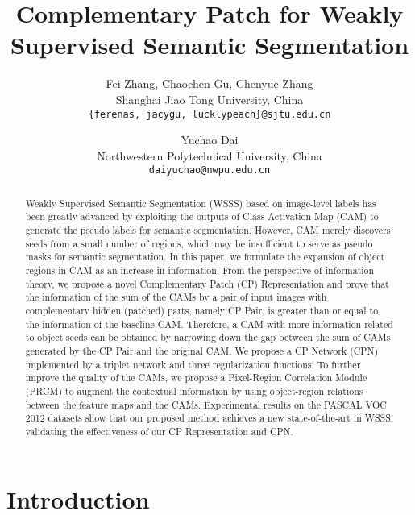 \documentclass[10pt,twocolumn,letterpaper]{article}
\begin{document}
\title{Complementary Patch for Weakly Supervised Semantic Segmentation}

\author{Fei Zhang, Chaochen Gu\footnotemark[1], Chenyue Zhang\\
Shanghai Jiao Tong University, China\\
{\tt\small \{ferenas, jacygu, lucklypeach\}@sjtu.edu.cn}
\and
Yuchao Dai\\
Northwestern Polytechnical University, China\\
{\tt\small daiyuchao@nwpu.edu.cn}
}

\maketitle

\renewcommand{\thefootnote}{\fnsymbol{footnote}}  

\ificcvfinal\thispagestyle{empty}\fi

\begin{abstract}
Weakly Supervised Semantic Segmentation (WSSS) based on image-level labels has been greatly advanced by exploiting the outputs of Class Activation Map (CAM) to generate the pseudo labels for semantic segmentation. However, CAM merely discovers seeds from a small number of regions, which may be insufficient to serve as pseudo masks for semantic segmentation.
In this paper, we formulate the expansion of object regions in CAM as an increase in information. From the perspective of information theory, we propose a novel Complementary Patch (CP) Representation and prove that the information of the sum of the CAMs by a pair of input images with complementary hidden (patched) parts, namely CP Pair, is greater than or equal to the information of the baseline CAM.
Therefore, a CAM with more information related to object seeds can be obtained by narrowing down the gap between the sum of CAMs generated by the CP Pair and the original CAM.
We propose a CP Network (CPN) implemented by a triplet network and three regularization functions.
To further improve the quality of the CAMs, we propose a Pixel-Region Correlation Module (PRCM) to augment the contextual information by using object-region relations between the feature maps and the CAMs.
Experimental results on the PASCAL VOC 2012 datasets show that our proposed method achieves a new state-of-the-art in WSSS, validating the effectiveness of our CP Representation and CPN.
\end{abstract}
\section{Introduction}
\end{document}
